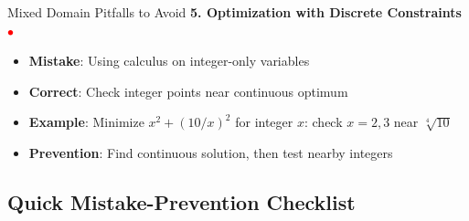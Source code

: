 \documentclass{article}
\begin{document}
\begin{trapbox}{Mixed Domain Pitfalls to Avoid}
\textbf{5. Optimization with Discrete Constraints} \textcolor{red}{$\bullet$}
\begin{itemize}[nosep]
\item \textbf{Mistake}: Using calculus on integer-only variables
\item \textbf{Correct}: Check integer points near continuous optimum
\item \textbf{Example}: Minimize $x^2 + (10/x)^2$ for integer $x$: check $x=2,3$ near $\sqrt[4]{10}$
\item \textbf{Prevention}: Find continuous solution, then test nearby integers
\end{itemize}
\end{trapbox}

\subsection{Quick Mistake-Prevention Checklist}
\end{document}
